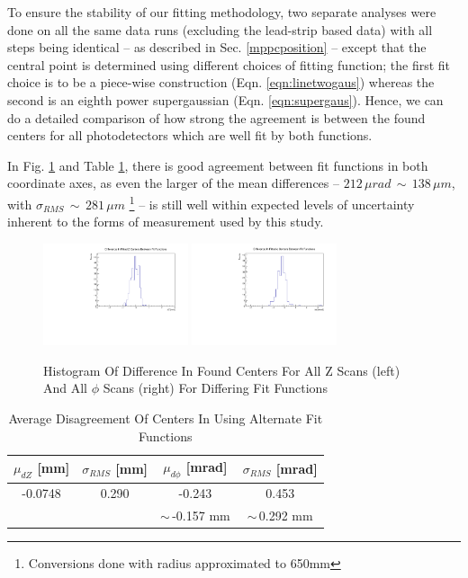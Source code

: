 To ensure the stability of our fitting methodology, two separate analyses were done on all the same data runs (excluding the lead-strip based data) with all steps being identical -- as described in Sec. \ref{mppcposition} -- except that the central point is determined using different choices of fitting function; the first fit choice is to be a piece-wise construction (Eqn. \ref{eqn:linetwogaus}) whereas the second is an eighth power supergaussian (Eqn. \ref{eqn:supergaus}). Hence, we can do a detailed comparison of how strong the agreement is between the found centers for all photodetectors which are well fit by both functions.

In Fig. \ref{fig:difffits} and Table \ref{tab:fitfcndiff}, there is good agreement between fit functions in both coordinate axes, as even the larger of the mean differences -- $212\, \mu rad \, \sim\, 138\, \mu m$, with $\sigma_{RMS} \, \sim \, 281 \, \mu m$ \footnote{Conversions done with radius approximated to 650mm} -- is still well within expected levels of uncertainty inherent to the forms of measurement used by this study. 
\begin{figure}[H]
    \centering
    \includegraphics[width=4.25cm]{graphics/terdzns.pdf}
    \includegraphics[width=4.25cm]{graphics/terdpns.pdf}
    \caption{Histogram Of Difference In Found Centers For All Z Scans (left) And All $\phi$ Scans (right) For Differing Fit Functions}
    \label{fig:difffits}
\end{figure}

\begin{table}[H]
    \centering
    \begin{tabular}{c c|c c}
        $\mu_{dZ}$ [mm]& $\sigma_{RMS}$ [mm]& $\mu_{d\phi}$ [mrad]& $\sigma_{RMS}$ [mrad]\\
        \hline 
        -0.0748 & 0.290 & -0.243 & 0.453 \\ 
         & & $\sim\,$-0.157 mm & $\sim\,$0.292 mm 
    \end{tabular}
    \caption{Average Disagreement Of Centers In Using Alternate Fit Functions}
    \label{tab:fitfcndiff}
\end{table}

